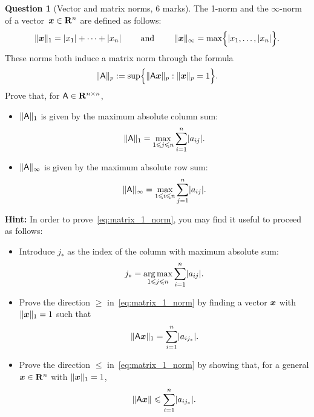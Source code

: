 \documentclass[11pt]{article}
\theoremstyle{definition}
\newtheorem{question}{Question}
\begin{document}
\newpage
\begin{question}
    [Vector and matrix norms, 6 marks]
    The 1-norm and the $\infty$-norm of a vector~$\mathbf{\boldsymbol{x}} \in \mathbf R^n$ are defined as follows:
    \[
        \lVert\mathbf{\boldsymbol{x}}\rVert_1 = \lvert x_1 \rvert + \dotsb + \lvert x_n \rvert
        \qquad \text{ and } \qquad
        \lVert\mathbf{\boldsymbol{x}}\rVert_{\infty} = \max \Bigl\{ \lvert x_1, \dotsc, \lvert x_n \rvert \Bigr\}.
    \]
    These norms both induce a matrix norm through the formula
    \[
        \lVert\mathsf A\rVert_p
        := \sup \Bigl\{ \lVert\mathsf A \mathbf{\boldsymbol{x}}\rVert_p : \lVert\mathbf{\boldsymbol{x}}\rVert_p = 1 \Bigr\}.
    \]
    Prove that, for $\mathsf A \in \mathbf R^{n \times n}$,
    \begin{itemize}
        \item
            $\lVert\mathsf A\rVert_1$ is given by the maximum absolute column sum:
            \begin{equation}
                \label{eq:matrix_1_norm}
               \lVert\mathsf A\rVert_1 = \max_{1 \leqslant j \leqslant n}  \sum_{i=1}^{n} \lvert a_{ij}\rvert.
            \end{equation}

        \item
            \mark
            $\lVert\mathsf A\rVert_{\infty}$ is given by the maximum absolute row sum:
            \[
                \lVert\mathsf A\rVert_{\infty} = \max_{1 \leqslant i \leqslant n}  \sum_{j=1}^{n} \lvert a_{ij}\rvert.
            \]
    \end{itemize}

    \textbf{Hint:} In order to prove~\eqref{eq:matrix_1_norm},
    you may find it useful to proceed as follows:
    \begin{itemize}
        \item
            Introduce $j_*$ as the index of the column with maximum absolute sum:
            \[
                j_* = \operatorname*{arg\,max}_{1 \leqslant j \leqslant n}  \sum_{i=1}^{n} \lvert a_{ij}\rvert.
            \]
        \item
            Prove the direction $\geq$ in~\eqref{eq:matrix_1_norm} by finding a vector $\mathbf{\boldsymbol{x}}$ with $\lVert\mathbf{\boldsymbol{x}}\rVert_1 = 1$ such that
            \[
                \lVert\mathsf A \mathbf{\boldsymbol{x}}\rVert_1 =  \sum_{i=1}^{n} \lvert a_{ij_*}\rvert.
            \]

        \item
            Prove the direction $\leq$ in~\eqref{eq:matrix_1_norm} by showing that,
            for a general $\mathbf{\boldsymbol{x}} \in \mathbf R^n$ with $\lVert\mathbf{\boldsymbol{x}}\rVert_1 = 1$,
            \[
               \lVert\mathsf A \mathbf{\boldsymbol{x}}\rVert \leqslant  \sum_{i=1}^{n} \lvert a_{ij_*}\rvert.
           \]
    \end{itemize}
\end{question}
\end{document}
